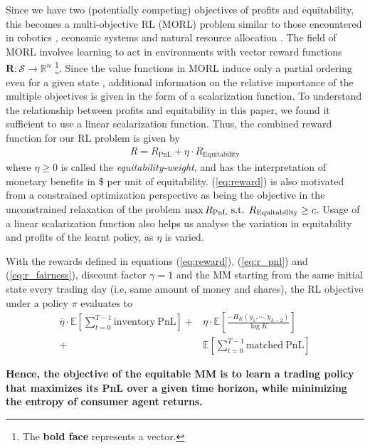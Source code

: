 \documentclass[sigconf]{acmart}
\begin{document}
Since we have two (potentially competing) objectives of profits and equitability, this becomes a multi-objective RL (MORL) problem similar to those encountered in robotics \cite{morlrobotics}, economic systems \cite{morleconomic} and natural resource allocation \cite{morlresourceallocation}. The field of MORL involves learning to act in environments with vector reward functions $\mathbf{R}:\mathcal{S}\rightarrow\mathbb{R}^n$ \footnote{The \textbf{bold face} represents a vector.}. Since the value functions in MORL induce only a partial ordering even for a given state \cite{morlsurvey}, additional information on the relative importance of the multiple objectives is given in the form of a scalarization function. To understand the relationship between profits and equitability in this paper, we found it sufficient to use a linear scalarization function. Thus, the combined reward function for our RL problem is given by\begin{align}
    R=R_{\mathrm{PnL}}+\eta\cdot R_{\mathrm{Equitability}}\label{eq:reward}
\end{align}
where $\eta\geq0$ is called the \textit{equitability-weight}, and has the interpretation of monetary benefits in \$ per unit of equitability. (\ref{eq:reward}) is also motivated from 
a constrained optimization perspective as being the objective in the unconstrained relaxation \cite{boyd2004convex} of the problem $\max R_{\mathrm{PnL}}\textnormal{ s.t. }R_\mathrm{Equitability}\geq c$. Usage of a linear scalarization function also helps us analyse the variation in equitability and profits of the learnt policy, as $\eta$ is varied. 

With the rewards defined in equations (\ref{eq:reward}), (\ref{eq:r_pnl}) and (\ref{eq:r_fairness}), discount factor $\gamma=1$ and the MM starting from the same initial state every trading day (i.e, same amount of money and shares), the RL objective under a policy $\pi$ evaluates to 
\begin{equation}
    \begin{aligned}
        \bar\eta\cdot\mathbb{E}\left[\sum_{t=0}^{T-1}\mathrm{inventory\ PnL}\right]+&\eta\cdot\mathbb{E}\left[\frac{-H_K\left(y_1,\cdots,y_{L-2}\right)}{\log K}\right]\\
        +&\mathbb{E}\left[\sum_{t=0}^{T-1}\mathrm{matched\ PnL}\right]
    \end{aligned}\label{eq:weighted_obj}
\end{equation}

\textbf{Hence, the objective of the equitable MM is to learn a trading policy that maximizes its PnL over a given time horizon, while minimizing the entropy of consumer agent returns.}
\end{document}
